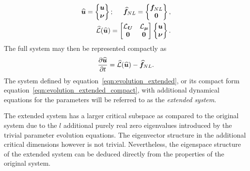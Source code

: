 \begin{eqnarray}
	{\widehat{ \boldsymbol{u} }} = \begin{Bmatrix}
		\boldsymbol{u} \\ 
		\boldsymbol{\nu}
	\end{Bmatrix}; \hspace{5mm}
	{\widehat{ \boldsymbol{f} }}_{NL} = \begin{Bmatrix}
		\boldsymbol{f}_{NL} \\ 
		\boldsymbol{0}
	\end{Bmatrix},	\\
	\mathcal{\widehat{L}}({\widehat{\boldsymbol{u}}}) =
	\begin{bmatrix}
		\mathcal{L}_{\boldsymbol{U}} & \mathcal{L}_{\boldsymbol{\mu}} \\
		\mathbf{0} 	& \mathbf{0}
	\end{bmatrix}
	\begin{Bmatrix}
		\boldsymbol{u} \\
		\boldsymbol{\nu}
	\end{Bmatrix}
	\label{eqn:linearized_operator_extended}.
\end{eqnarray}
The full system may then be represented compactly as
\begin{equation}
	\label{eqn:evolution_extended_compact}
	\dfrac{\partial {\widehat{ \boldsymbol{u} }}}{\partial t} =
	\mathcal{\widehat{L}}({\widehat{\boldsymbol{u}}})  - {\widehat{\boldsymbol{f}}}_{NL}.
\end{equation}
The system defined by equation~\ref{eqn:evolution_extended}, or its compact form equation~\ref{eqn:evolution_extended_compact}, with additional dynamical equations for the parameters will be referred to as the \emph{extended system}. 

The extended system has a larger critical subspace as compared to the original system due to the $l$ additional purely real zero eigenvalues introduced by the trivial parameter evolution equations. The eigenvector structure in the additional critical dimensions however is not trivial. Nevertheless, the eigenspace structure of the extended system can be deduced directly from the properties of the original system. 

